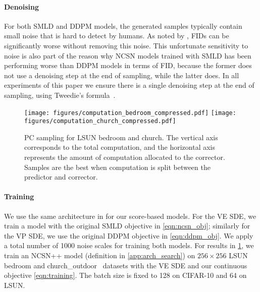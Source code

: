 \documentclass{article} \usepackage{iclr2021_conference,times}
\begin{document}
\paragraph{Denoising} For both SMLD and DDPM models, the generated samples typically contain small noise that is hard to detect by humans. As noted by \citet{jolicoeur2020adversarial}, FIDs can be significantly worse without removing this noise. This unfortunate sensitivity to noise is also part of the reason why NCSN models trained with SMLD has been performing worse than DDPM models in terms of FID, because the former does not use a denoising step at the end of sampling, while the latter does. In all experiments of this paper we ensure there is a single denoising step at the end of sampling, using Tweedie's formula~\citep{efron2011tweedie}.


\begin{figure}[h]
    \centering
    \texttt{[image: figures/computation\_bedroom\_compressed.pdf]}
    \texttt{[image: figures/computation\_church\_compressed.pdf]}
    \caption{PC sampling for LSUN bedroom and church. The vertical axis corresponds to the total computation, and the horizontal axis represents the amount of computation allocated to the corrector. Samples are the best when computation is split between the predictor and corrector.}
    \label{fig:computation}
\end{figure}




\paragraph{Training} 
We use the same architecture in \cite{ho2020denoising} for our score-based models. For the VE SDE, we train a model with the original SMLD objective in \cref{eqn:ncsn_obj}; similarly for the VP SDE, we use the original DDPM objective in \cref{eqn:ddpm_obj}. We apply a total number of 1000 noise scales for training both models. For results in \cref{fig:computation}, we train an NCSN++ model (definition in \cref{app:arch_search}) on $256\times 256$ LSUN bedroom and church\_outdoor~\citep{yu2015lsun} datasets with the VE SDE and our continuous objective \cref{eqn:training}. The batch size is fixed to 128 on CIFAR-10 and 64 on LSUN.
\end{document}

